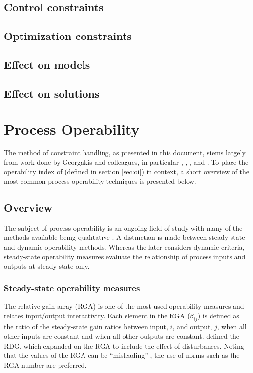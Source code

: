\subsection{Control constraints}
\subsection{Optimization constraints}

\subsection{Effect on models}
\subsection{Effect on solutions}

\section{Process Operability}
The method of constraint handling, as presented in this document, stems largely from work done by Georgakis and colleagues, in particular \citet{vinsonphd}, \citet{vinsonartoi}, \citet{limaphd}, \citet{opconproc} and \citet{opidealrx}. 
To place the operability index of \citet{vinsonphd} (defined in section \ref{sec:oi}) in context, a short overview of the most common process operability techniques is presented below.
\subsection{Overview}
The subject of process operability is an ongoing field of study with many of the methods available being qualitative \citep[164]{skogestad}. 
A distinction is made between steady-state and dynamic operability methods. 
Whereas the later considers dynamic criteria, steady-state operability measures evaluate the relationship of process inputs and outputs at steady-state only.
\subsubsection{Steady-state operability measures}
The relative gain array (RGA) is one of the most used operability measures \citep[576]{luyben} and relates input/output interactivity.
Each element in the RGA ($\beta_{ij}$) is defined as the ratio of the steady-state gain ratios between input, $i$, and output, $j$, when all other inputs are constant and when all other outputs are constant.
\citet{artrdg} defined the RDG, which expanded on the RGA to include the effect of disturbances. 
Noting that the values of the RGA can be ``misleading'' \citep[87]{skogestad}, the use of norms such as the RGA-number are preferred.

